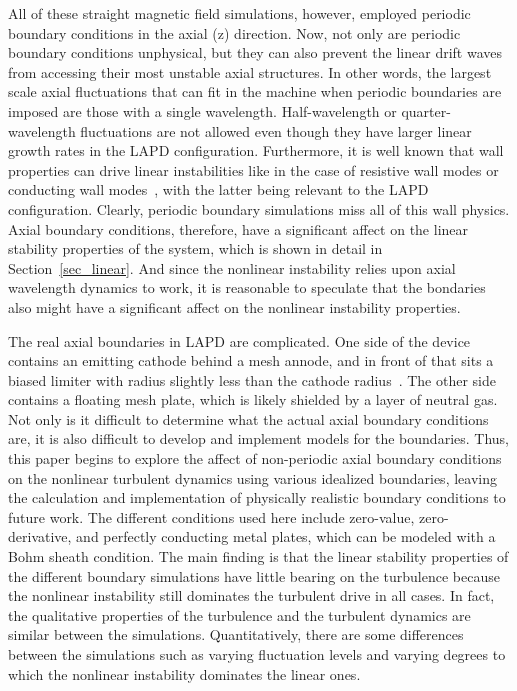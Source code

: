 \documentclass[showpacs,preprintnumbers,amsmath,amssymb,superscriptaddress,aip]{revtex4-1}
\begin{document}
All of these straight magnetic field simulations, however, employed periodic boundary conditions in the axial (z) direction. 
Now, not only are periodic boundary conditions unphysical, but they can also prevent the linear drift waves from accessing their most unstable axial structures.
In other words, the largest scale axial fluctuations that can fit in the machine when periodic boundaries are imposed are those with a single wavelength. 
Half-wavelength or quarter-wavelength fluctuations
are not allowed even though they have larger linear growth rates in the LAPD configuration. Furthermore, it is well known that wall properties can drive linear instabilities like in
the case of resistive wall modes or conducting wall modes~\cite{berk1991}, with the latter being relevant to the LAPD configuration. Clearly, periodic boundary simulations miss all of this wall physics.
Axial boundary conditions, therefore, have a significant
affect on the linear stability properties of the system, which is shown in detail in Section~\ref{sec_linear}. And since the nonlinear instability relies upon axial wavelength dynamics to work, it is 
reasonable to speculate that the bondaries also might have a significant affect on the nonlinear instability properties.

The real axial boundaries in LAPD are complicated. One side of the device contains an emitting cathode behind a mesh annode, and in front of that sits a biased limiter with radius slightly
less than the cathode radius~\cite{schaffner2012}.
The other side contains a floating mesh plate, which is likely shielded by a layer of neutral gas. Not only is it difficult to determine what the actual axial boundary conditions are, it is also
difficult to develop and implement models for the boundaries. Thus, this paper begins to explore the affect of non-periodic axial boundary conditions on the nonlinear turbulent dynamics using various
idealized boundaries, leaving the calculation and implementation of physically realistic boundary conditions to future work. 
The different conditions used here include zero-value, zero-derivative, and perfectly conducting metal plates, which can be modeled with a Bohm sheath condition. 
The main finding is that the linear stability properties of the different boundary simulations have little bearing on the turbulence because the 
nonlinear instability still dominates the turbulent drive in all cases. 
In fact, the qualitative properties of the turbulence and the turbulent
dynamics are similar between the simulations. Quantitatively, there are some differences between the simulations such as varying fluctuation levels and varying degrees to which
the nonlinear instability dominates the linear ones.
\end{document}
